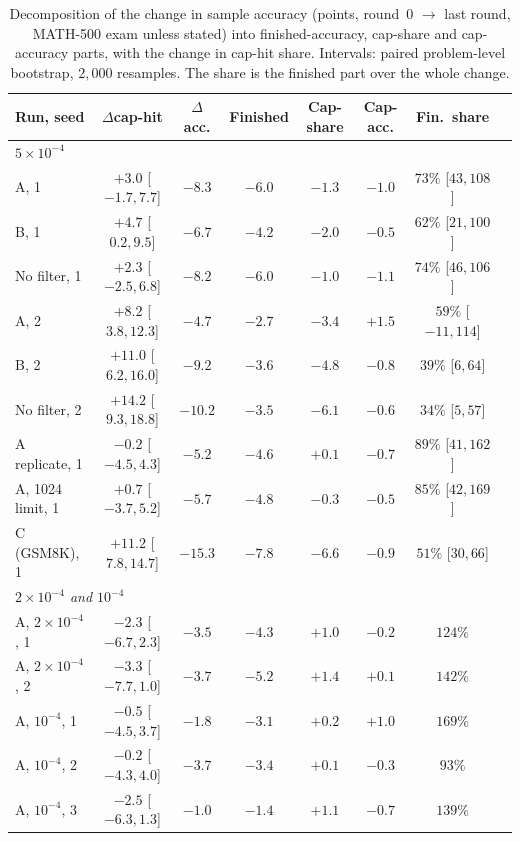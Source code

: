 \documentclass[runningheads]{llncs}
\begin{document}
\begin{table}[!htb]
\caption{Decomposition of the change in sample accuracy (points, round~0 $\to$
last round, MATH-500 exam unless stated) into finished-accuracy, cap-share and
cap-accuracy parts, with the change in cap-hit share. Intervals: paired
problem-level bootstrap, $2{,}000$ resamples. The share is the finished part
over the whole change.}
\label{tab:decomp}
\centering
\scriptsize
\setlength{\tabcolsep}{2pt}
\begin{tabular}{lccccccc}
\toprule
Run, seed & $\Delta$cap-hit & $\Delta$acc. & Finished & Cap-share & Cap-acc. & Fin.\ share \\
\midrule
\multicolumn{7}{l}{\emph{$5\times10^{-4}$}} \\
A, 1 & $+3.0$ [$-1.7,7.7$] & $-8.3$ & $-6.0$ & $-1.3$ & $-1.0$ & $73\%$ [$43,108$] \\
B, 1 & $+4.7$ [$0.2,9.5$] & $-6.7$ & $-4.2$ & $-2.0$ & $-0.5$ & $62\%$ [$21,100$] \\
No filter, 1 & $+2.3$ [$-2.5,6.8$] & $-8.2$ & $-6.0$ & $-1.0$ & $-1.1$ & $74\%$ [$46,106$] \\
A, 2 & $+8.2$ [$3.8,12.3$] & $-4.7$ & $-2.7$ & $-3.4$ & $+1.5$ & $59\%$ [$-11,114$] \\
B, 2 & $+11.0$ [$6.2,16.0$] & $-9.2$ & $-3.6$ & $-4.8$ & $-0.8$ & $39\%$ [$6,64$] \\
No filter, 2 & $+14.2$ [$9.3,18.8$] & $-10.2$ & $-3.5$ & $-6.1$ & $-0.6$ & $34\%$ [$5,57$] \\
A replicate, 1 & $-0.2$ [$-4.5,4.3$] & $-5.2$ & $-4.6$ & $+0.1$ & $-0.7$ & $89\%$ [$41,162$] \\
A, 1024 limit, 1 & $+0.7$ [$-3.7,5.2$] & $-5.7$ & $-4.8$ & $-0.3$ & $-0.5$ & $85\%$ [$42,169$] \\
C (GSM8K), 1 & $+11.2$ [$7.8,14.7$] & $-15.3$ & $-7.8$ & $-6.6$ & $-0.9$ & $51\%$ [$30,66$] \\
\multicolumn{7}{l}{\emph{$2\times10^{-4}$ and $10^{-4}$}} \\
A, $2\times10^{-4}$, 1 & $-2.3$ [$-6.7,2.3$] & $-3.5$ & $-4.3$ & $+1.0$ & $-0.2$ & $124\%$ \\
A, $2\times10^{-4}$, 2 & $-3.3$ [$-7.7,1.0$] & $-3.7$ & $-5.2$ & $+1.4$ & $+0.1$ & $142\%$ \\
A, $10^{-4}$, 1 & $-0.5$ [$-4.5,3.7$] & $-1.8$ & $-3.1$ & $+0.2$ & $+1.0$ & $169\%$ \\
A, $10^{-4}$, 2 & $-0.2$ [$-4.3,4.0$] & $-3.7$ & $-3.4$ & $+0.1$ & $-0.3$ & $93\%$ \\
A, $10^{-4}$, 3 & $-2.5$ [$-6.3,1.3$] & $-1.0$ & $-1.4$ & $+1.1$ & $-0.7$ & $139\%$ \\
\bottomrule
\end{tabular}
\end{table}
\end{document}
